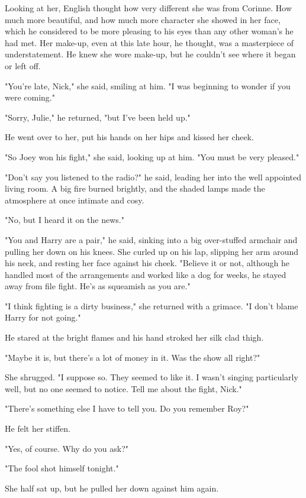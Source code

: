 \documentclass{novel}
\begin{document}
Looking at her, English thought how very different she was from Corinne. How much more beautiful, and how much more character she showed in her face, which he considered to be more pleasing to his eyes than any other woman's he had met. Her make-up, even at this late hour, he thought, was a masterpiece of understatement. He knew she wore make-up, but he couldn't see where it began or left off.

"You're late, Nick," she said, smiling at him. "I was beginning to wonder if you were coming."

"Sorry, Julie," he returned, "but I've been held up."

He went over to her, put his hands on her hips and kissed her cheek.

"So Joey won his fight," she said, looking up at him. "You must be very pleased."

"Don't say you listened to the radio?" he said, leading her into the well appointed living room. A big fire burned brightly, and the shaded lamps made the atmosphere at once intimate and cosy.

"No, but I heard it on the news."

"You and Harry are a pair," he said, sinking into a big over-stuffed armchair and pulling her down on his knees. She curled up on his lap, slipping her arm around his neck, and resting her face against his cheek. "Believe it or not, although he handled most of the arrangements and worked like a dog for weeks, he stayed away from file fight. He's as squeamish as you are."

"I think fighting is a dirty business," she returned with a grimace. "I don't blame Harry for not going."

He stared at the bright flames and his hand stroked her silk clad thigh.

"Maybe it is, but there's a lot of money in it. Was the show all right?"

She shrugged. "I suppose so. They seemed to like it. I wasn't singing particularly well, but no one seemed to notice. Tell me about the fight, Nick."

"There's something else I have to tell you. Do you remember Roy?"

He felt her stiffen.

"Yes, of course. Why do you ask?"

"The fool shot himself tonight."

She half sat up, but he pulled her down against him again.
\end{document}
